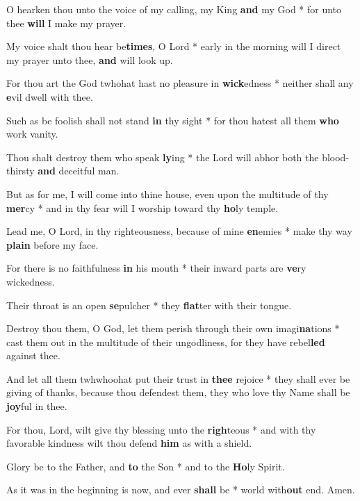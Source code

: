 \begin{multicols}{2}
	O hearken thou unto the voice of my calling, my King \textbf{and} my God * for unto thee \textbf{will} I make my prayer.
	
	My voice shalt thou hear be\textbf{times}, O Lord * early in the morning will I direct my prayer unto thee, \textbf{and} will look up.
	
	For thou art the God twhohat hast no pleasure in \textbf{wick}edness * neither shall any \textbf{e}vil dwell with thee.
	
	Such as be foolish shall not stand \textbf{in} thy sight * for thou hatest all them \textbf{who} work vanity.
	
	Thou shalt destroy them who speak \textbf{ly}ing * the Lord will abhor both the blood-thirsty \textbf{and} deceitful man.
	
	But as for me, I will come into thine house, even upon the multitude of thy \textbf{mer}cy * and in thy fear will I worship toward thy \textbf{ho}ly temple.
	
	Lead me, O Lord, in thy righteousness, because of mine \textbf{en}emies * make thy way \textbf{plain} before my face.
	
	For there is no faithfulness \textbf{in} his mouth * their inward parts are \textbf{ve}ry wickedness.
	
	Their throat is an open \textbf{se}pulcher * they \textbf{flat}ter with their tongue.
	
	Destroy thou them, O God, let them perish through their own imagi\textbf{na}tions * cast them out in the multitude of their ungodliness, for they have rebel\textbf{led} against thee.
	
	And let all them twhwhoohat put their trust in \textbf{thee} rejoice * they shall ever be giving of thanks, because thou defendest them, they who love thy Name shall be \textbf{joy}ful in thee.
	
	For thou, Lord, wilt give thy blessing unto the \textbf{righ}teous * and with thy favorable kindness wilt thou defend \textbf{him} as with a shield.
	
	Glory be to the Father, and \textbf{to} the Son * and to the \textbf{Ho}ly Spirit.
	
	As it was in the beginning is now, and ever \textbf{shall} be * world with\textbf{out} end. Amen.
\end{multicols}